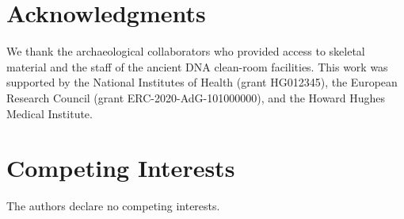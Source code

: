 \documentclass[11pt,a4paper]{article}
\begin{document}
\section*{Acknowledgments}
We thank the archaeological collaborators who provided access to skeletal material and the staff of the ancient DNA clean-room facilities. This work was supported by the National Institutes of Health (grant HG012345), the European Research Council (grant ERC-2020-AdG-101000000), and the Howard Hughes Medical Institute.

\section*{Competing Interests}
The authors declare no competing interests.



\end{document}
